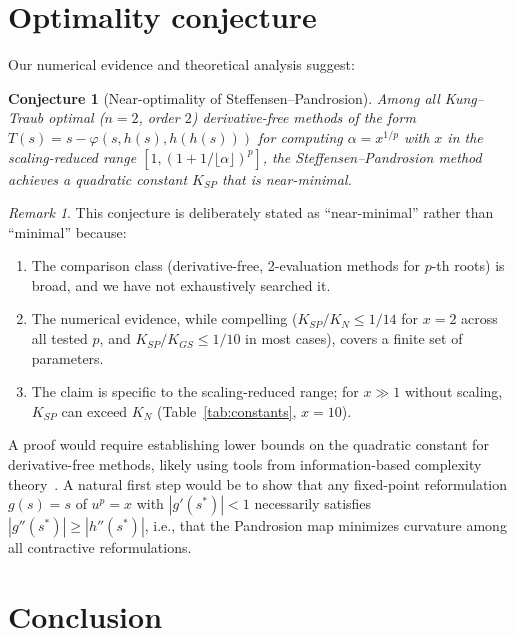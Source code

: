 \documentclass[10pt,a4paper,oneside]{book}
\newtheorem{conjecture}[theorem]{Conjecture}
\theoremstyle{definition}
\theoremstyle{remark}
\newtheorem{remark}[theorem]{Remark}
\begin{document}
\section{Optimality conjecture}
\label{sec:conjecture}

Our numerical evidence and theoretical analysis suggest:

\begin{conjecture}[Near-optimality of Steffensen--Pandrosion]
\label{conj:optimality}
Among all Kung--Traub optimal ($n = 2$, order $2$) derivative-free methods of the form $T(s) = s - \varphi(s, h(s), h(h(s)))$ for computing $\alpha = x^{1/p}$ with $x$ in the scaling-reduced range $[1, (1+1/\lfloor\alpha\rfloor)^p]$, the Steffensen--Pandrosion method achieves a quadratic constant $K_{SP}$ that is near-minimal.
\end{conjecture}

\begin{remark}
This conjecture is deliberately stated as ``near-minimal'' rather than ``minimal'' because:
\begin{enumerate}
  \item The comparison class (derivative-free, 2-evaluation methods for $p$-th roots) is broad, and we have not exhaustively searched it.
  \item The numerical evidence, while compelling ($K_{SP}/K_N \leq 1/14$ for $x = 2$ across all tested $p$, and $K_{SP}/K_{GS} \leq 1/10$ in most cases), covers a finite set of parameters.
  \item The claim is specific to the scaling-reduced range; for $x \gg 1$ without scaling, $K_{SP}$ can exceed $K_N$ (Table~\ref{tab:constants}, $x = 10$).
\end{enumerate}
A proof would require establishing lower bounds on the quadratic constant for derivative-free methods, likely using tools from information-based complexity theory~\cite{traub}.  A natural first step would be to show that any fixed-point reformulation $g(s) = s$ of $u^p = x$ with $|g'(s^*)| < 1$ necessarily satisfies $|g''(s^*)| \geq |h''(s^*)|$, i.e., that the Pandrosion map minimizes curvature among all contractive reformulations.
\end{remark}

\section{Conclusion}
\label{sec:conclusion}
\end{document}
